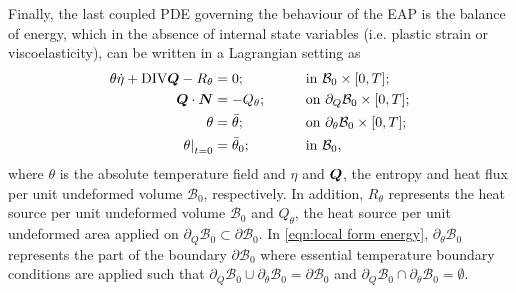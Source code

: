 Finally, the last coupled PDE governing the behaviour of the EAP is the balance of energy, which in the absence of internal state variables (i.e. plastic strain or viscoelasticity), can be written in a Lagrangian setting as
%
\begin{equation}\label{eqn:local form energy}
\begin{aligned}
\theta\dot{\eta} + \text{DIV}\vect{Q} - R_{\theta} & = 0;&\qquad& \text{in}\,\,\mathcal{B}_0\times [0,T];\\
%
\vect{Q}\cdot\vect{N}& = -Q_{\theta};&\qquad&\text{on}\,\, \partial_{Q}\mathcal{B}_0\times [0,T];\\
%
\theta & = \bar{\theta};&\qquad&\text{on}\,\,\partial_{\theta}\mathcal{B}_0\times [0,T];\\
\left.{\theta}\right\vert_{t=0}&={\bar{\theta}}_0;&\qquad& \text{in}\,\,\mathcal{B}_0,
\end{aligned}
\end{equation}
%
where $\theta$ is the absolute temperature field and $\eta$ and $\boldsymbol{Q}$, the entropy and heat flux per unit undeformed volume $\mathcal{B}_0$, respectively. In addition, $R_{\theta}$  represents the heat source per unit undeformed volume $\mathcal{B}_0$ and $Q_{\theta}$, the heat source per unit undeformed area applied on $\partial_{Q}\mathcal{B}_0\subset\partial\mathcal{B}_0$. In \eqref{eqn:local form energy}, $\partial_{\theta}\mathcal{B}_0$ represents the part of the boundary $\partial\mathcal{B}_0$ where essential temperature boundary conditions are applied such that $\partial_{Q}\mathcal{B}_0\cup\partial_{\theta}\mathcal{B}_0 = \partial\mathcal{B}_0$ and $\partial_{Q}\mathcal{B}_0\cap\partial_{\theta}\mathcal{B}_0 = \emptyset$. 
%
